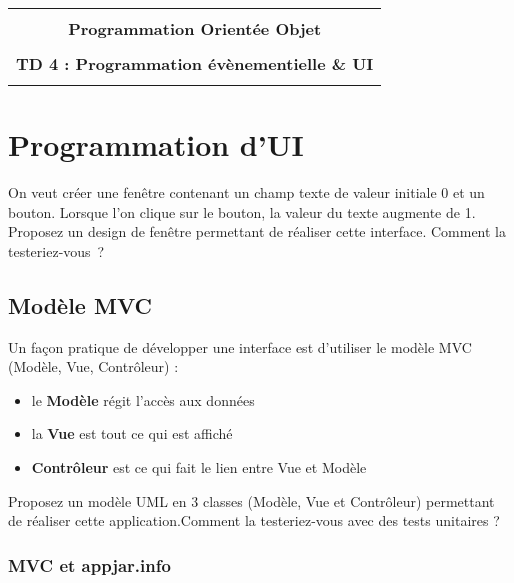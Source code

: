 \documentclass[12pt]{article}
\begin{document}
    
    
        \begin{center}
          \begin{tabular}{c}
          \hline
        \\
            {\bf \textsf {\Large Programmation Orientée Objet}}\\
        \\
            {\bf \textsf {\Large TD 4 : Programmation évènementielle \& UI}}\\
        \\
            \hline
          \end{tabular}
        \end{center}
        \vspace{15mm}
   
    
    \section{Programmation d'UI}
    
    On veut créer une fenêtre contenant un champ texte de valeur initiale 0 et un bouton. Lorsque l'on clique sur le bouton, la valeur du texte augmente de 1.
    Proposez un design de fenêtre permettant de réaliser cette interface.
    Comment la testeriez-vous~?
    
    \subsection{Modèle MVC}
    
    Un façon pratique de développer une interface est d'utiliser le modèle MVC (Modèle, Vue, Contrôleur) :
    \begin{itemize}
        \item le {\bf Modèle} régit l'accès aux données
      \item la {\bf Vue} est tout ce qui est affiché
      \item {\bf Contrôleur} est ce qui fait le lien entre Vue et Modèle
    
    \end{itemize}
    Proposez un modèle UML en 3 classes (Modèle, Vue et Contrôleur) permettant de réaliser cette application.Comment la testeriez-vous avec des tests unitaires ?
    
    \subsubsection{MVC et appjar.info}
    
\end{document}
